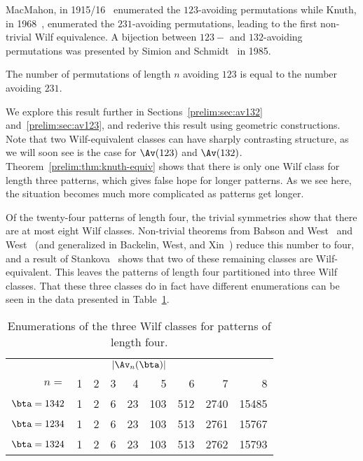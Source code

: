 \documentclass[12pt,twoside]{memoir}
\begin{document}
      MacMahon, in 1915/16~\cite{PercyBook} enumerated the $123$-avoiding
      permutations while Knuth, in 1968~\cite{Knuth}, enumerated the
      $231$-avoiding permutations, leading to the first non-trivial Wilf
      equivalence. A bijection between $123-$ and $132$-avoiding permutations was
      presented by Simion and Schmidt~\cite{Simion1985} in 1985.

      \begin{theorem}
      \label{prelim:thm:knuth-equiv}
        The number of permutations of length $n$ avoiding $123$ is equal to the number
        avoiding $231$. 
      \end{theorem}

      We explore this result further in Sections~\ref{prelim:sec:av132}
      and~\ref{prelim:sec:av123}, and rederive this result using geometric
      constructions. Note that two Wilf-equivalent classes can have sharply
      contrasting structure, as we will soon see is the case for $\Av(123)$ and
      $\Av(132)$. 
      Theorem~\ref{prelim:thm:knuth-equiv} shows that there is only one Wilf
      class for length three patterns, which gives false hope for longer
      patterns.
      As we see here, the situation becomes much more complicated as patterns get
      longer. 

      Of the twenty-four patterns of length four, the trivial symmetries show
      that there are at most eight Wilf classes. 
      Non-trivial theorems from Babson and West~\cite{BabsonWest} and
      West~\cite{WestDiss} (and generalized in Backelin, West, and
      Xin~\cite{Backelin2007}) reduce this number to four, and 
      a result of Stankova~\cite{Stankova1994} shows that two of these
      remaining classes are Wilf-equivalent. This leaves the patterns of length
      four partitioned into three Wilf classes. That these three classes do in
      fact have different enumerations can be seen in the data presented in
      Table~\ref{prelim:tab:four-classes}. 

      \begin{table}[t] \centering
        \caption{Enumerations of the three Wilf classes for patterns of length
        four.}
        \label{prelim:tab:four-classes}
        \begin{tabular}{rrrrrrrrr}
        \multicolumn{9}{c}{$|\Av_n(\bta)|$} \\ 
         $n = $ & 1  & 2 & 3 & 4  & 5 & 6 & 7 & 8
          \\ \hline
        $\bta = 1342$ &
          1 & 2 & 6 & 23 & 103 & 512 & 2740 & 15485 \\
        $\bta = 1234$ &
          1 & 2 & 6 & 23 & 103 & 513 & 2761 & 15767 \\
        $\bta = 1324$ &
          1 & 2 & 6 & 23 & 103 & 513 & 2762 & 15793 \\
        \end{tabular}
      \end{table}
\end{document}
